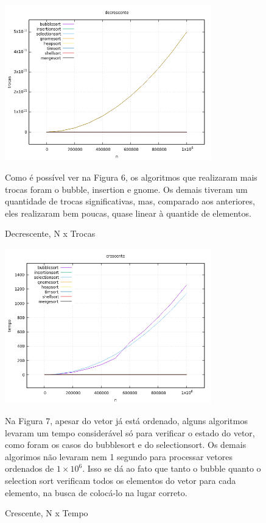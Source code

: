 \documentclass[report]{uftex}
\begin{document}
\begin{figure}[h]
\centering
\caption{Decrescente, N x Trocas}
\includegraphics[width=0.8\textwidth]{graphs/decrescente-trocas.png}

Como é possível ver na Figura 6, os algoritmos que realizaram mais trocas foram o bubble, insertion e gnome. Os demais tiveram um quantidade de trocas significativas, mas, comparado aos anteriores, eles realizaram bem poucas, quase linear à quantide de elementos.
\end{figure}


\begin{figure}[h]
\centering
\caption{Crescente, N x Tempo}
\includegraphics[width=0.8\textwidth]{graphs/crescente-tempo.png}

Na Figura 7, apesar do vetor já está ordenado, alguns algoritmos levaram um tempo considerável só para verificar o estado do vetor, como foram os casos do bubblesort e do selectionsort. Os demais algorimos não levaram nem 1 segundo para processar vetores ordenados de $1\times10^6$. Isso se dá ao fato que tanto o bubble quanto o selection sort verificam todos os elementos do vetor para cada elemento, na busca de colocá-lo na lugar correto.

\end{figure}
\end{document}
